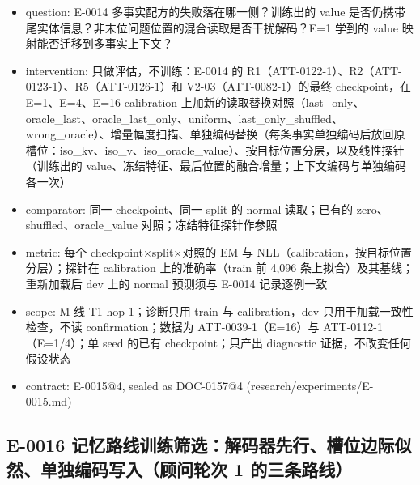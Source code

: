 \documentclass[11pt]{article}
\begin{document}
\begin{itemize}
\item question: E-0014 多事实配方的失败落在哪一侧？训练出的 value 是否仍携带尾实体信息？非末位问题位置的混合读取是否干扰解码？E=1 学到的 value 映射能否迁移到多事实上下文？
\item intervention: 只做评估，不训练：E-0014 的 R1（ATT-0122-1）、R2（ATT-0123-1）、R5（ATT-0126-1）和 V2-03（ATT-0082-1）的最终 checkpoint，在 E=1、E=4、E=16 calibration 上加新的读取替换对照（last\_only、oracle\_last、oracle\_last\_only、uniform、last\_only\_shuffled、wrong\_oracle）、增量幅度扫描、单独编码替换（每条事实单独编码后放回原槽位：iso\_kv、iso\_v、iso\_oracle\_value）、按目标位置分层，以及线性探针（训练出的 value、冻结特征、最后位置的融合增量；上下文编码与单独编码各一次）
\item comparator: 同一 checkpoint、同一 split 的 normal 读取；已有的 zero、shuffled、oracle\_value 对照；冻结特征探针作参照
\item metric: 每个 checkpoint\ensuremath{\times}split\ensuremath{\times}对照的 EM 与 NLL（calibration，按目标位置分层）；探针在 calibration 上的准确率（train 前 4,096 条上拟合）及其基线；重新加载后 dev 上的 normal 预测须与 E-0014 记录逐例一致
\item scope: M 线 T1 hop 1；诊断只用 train 与 calibration，dev 只用于加载一致性检查，不读 confirmation；数据为 ATT-0039-1（E=16）与 ATT-0112-1（E=1/4）；单 seed 的已有 checkpoint；只产出 diagnostic 证据，不改变任何假设状态
\item contract: E-0015@4, sealed as DOC-0157@4 (research/experiments/E-0015.md)
\end{itemize}

\subsection*{E-0016 记忆路线训练筛选：解码器先行、槽位边际似然、单独编码写入（顾问轮次 1 的三条路线）}
\end{document}
